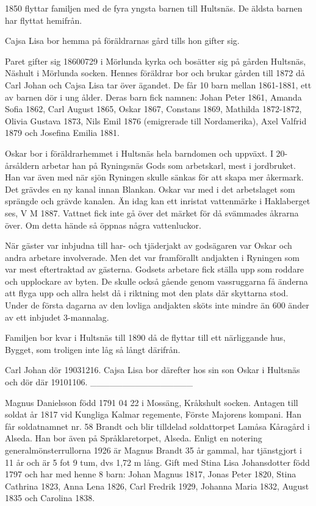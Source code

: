 1850 flyttar familjen med de fyra yngsta barnen till Hultsnäs. De äldsta barnen har flyttat hemifrån.

Cajsa Lisa bor hemma på föräldrarnas gård tills hon gifter sig.




Paret gifter sig 18600729 i Mörlunda kyrka och bosätter sig på gården Hultsnäs, Näshult i Mörlunda socken. Hennes föräldrar bor och brukar gården till 1872 då Carl Johan och Cajsa Lisa tar över ägandet.
De får 10 barn mellan 1861-1881, ett av barnen dör i ung ålder.
Deras barn fick namnen: Johan Peter 1861, Amanda Sofia 1862, Carl August 1865, Oskar 1867, Constans 1869, Mathilda 1872-1872, Olivia Gustava 1873, Nils Emil 1876 (emigrerade till Nordamerika), Axel Valfrid 1879 och Josefina Emilia 1881.


Oskar bor i föräldrarhemmet  i Hultsnäs hela barndomen och uppväxt. I 20-årsåldern arbetar han på Ryningsnäs Gods som arbetskarl, mest i jordbruket. Han var även med när sjön Ryningen skulle sänkas för att skapa mer åkermark. Det grävdes en ny kanal innan Blankan. Oskar var med i det arbetslaget som sprängde och grävde kanalen. Än idag kan ett inristat vattenmärke i Haklaberget ses, V M 1887. Vattnet fick inte gå över det märket för då svämmades åkrarna över. Om detta hände så öppnas några vattenluckor. 


När gäster var inbjudna till har- och tjäderjakt  av godsägaren var Oskar och andra arbetare involverade. Men det var framförallt andjakten i Ryningen som var mest eftertraktad av gästerna. Godsets arbetare fick ställa upp som roddare och upplockare av byten. De skulle också gående genom vassruggarna få änderna att flyga upp och allra helst då i riktning mot den plats där skyttarna stod. Under de första dagarna av den lovliga andjakten sköts inte mindre än 600 änder av ett inbjudet 3-mannalag.


Familjen bor kvar i Hultsnäs till 1890 då de flyttar till ett närliggande hus, Bygget, som troligen inte låg så långt därifrån.


Carl Johan dör 19031216. Cajsa Lisa bor därefter hos sin son Oskar i Hultsnäs och dör där 19101106.
________________



Magnus Danielsson född 1791 04 22 i Mossäng, Kråkshult socken. Antagen till soldat år 1817 vid Kungliga Kalmar regemente, Förste Majorens kompani. Han får soldatnamnet nr. 58 Brandt och blir tilldelad soldattorpet Lamåsa Kåragård i Alseda. Han bor även på Språklaretorpet, Alseda.
Enligt en notering generalmönsterrullorna 1926 är Magnus Brandt 35 år gammal, har tjänstgjort i 11 år och är 5 fot 9 tum, dvs 1,72 m lång. Gift med Stina Lisa Johansdotter född 1797 och har med henne 8 barn: Johan Magnus 1817, Jonas Peter 1820, Stina Cathrina 1823, Anna Lena 1826, Carl Fredrik 1929, Johanna Maria 1832, August 1835 och Carolina 1838.


